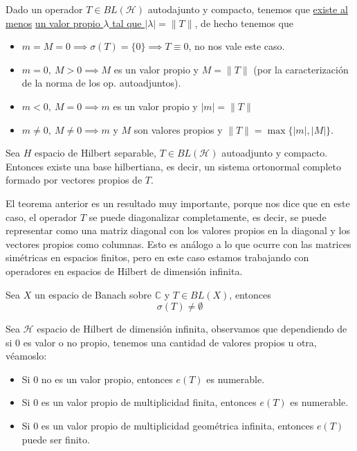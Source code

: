 \documentclass[12pt]{book}
\newcommand{\C}{\mathbb{C}}
\begin{document}
\begin{coro}
    Dado un operador $T\in BL(\mathcal{H})$ autodajunto y compacto, tenemos que \underline{existe al menos} \underline{un valor propio $\lambda$ tal que $|\lambda|=\|T\|$}, de hecho tenemos que
    \begin{itemize}
        \item $m = M = 0 \implies \sigma(T) = \{0\} \implies T \equiv 0$, no nos vale este caso.
        \item $m = 0, \ M > 0 \implies M$ es un valor propio y $M = \|T\|$ (por la caracterización de la norma de los op. autoadjuntos).
        \item $m < 0, \ M = 0 \implies m$ es un valor propio y $|m| = \|T\|$
        \item $m \neq 0, \ M \neq 0 \implies m$ y $M$ son valores propios y $\|T\| = \max\{|m|, |M|\}$.
    \end{itemize}
\end{coro}


\begin{teo}
    Sea $H$ espacio de Hilbert separable, $T \in BL(\mathcal{H})$ autoadjunto y compacto. Entonces existe una base hilbertiana, es decir, un sistema ortonormal completo formado por vectores propios de $T$.
\end{teo}


\begin{observacion}
    El teorema anterior es un resultado muy importante, porque nos dice que en este caso, el operador $T$ se puede diagonalizar completamente, es decir, se puede representar como una matriz diagonal con los valores propios en la diagonal y los vectores propios como columnas. Esto es análogo a lo que ocurre con las matrices simétricas en espacios finitos, pero en este caso estamos trabajando con operadores en espacios de Hilbert de dimensión infinita. \\
\end{observacion}

\begin{teo}
    Sea $X$ un espacio de Banach sobre $\C$ y $T \in BL(X)$, entonces 
    $$\sigma(T) \neq \emptyset$$
\end{teo}
\begin{observacion}   
    Sea $\mathcal{H}$ espacio de Hilbert de dimensión infinita, observamos que dependiendo de si $0$ es valor o no propio, tenemos una cantidad de valores propios u otra, véamoslo:
    \begin{itemize}
        \item Si $0$ no es un valor propio, entonces $e(T)$ es numerable.
        \item Si $0$ es un valor propio de multiplicidad finita, entonces $e(T)$ es numerable.
        \item Si $0$ es un valor propio de multiplicidad geométrica infinita, entonces $e(T)$ puede ser finito.
    \end{itemize}
\end{observacion}
\end{document}
